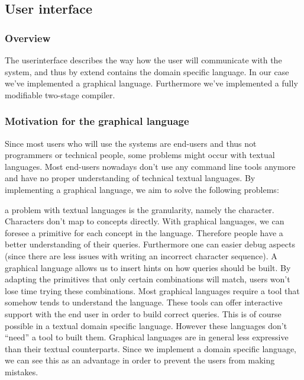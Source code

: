 
\subsection{User interface}
\subsubsection{Overview}
The userinterface describes the way how the user will communicate with the
system, and thus by extend contains the domain specific language. In our case
we've implemented a graphical language. Furthermore we've implemented a fully
modifiable two-stage compiler.
\subsubsection{Motivation for the graphical language}
Since most users who will use the systems are end-users and thus not
programmers or technical people, some problems might occur with textual
languages. Most end-users nowadays don't use any command line tools anymore and
have no proper understanding of technical textual languages. By implementing a
graphical language, we aim to solve the following problems:
\begin{itemize}
  a problem with textual languages is
the granularity, namely the character. Characters don't map to concepts
directly. With graphical languages, we can foresee a primitive for each concept
in the language. Therefore people have a better understanding of their queries.
Furthermore one can easier debug aspects (since there are less issues with
writing an incorrect character sequence).
  A graphical language allows us to insert
hints on how queries should be built. By adapting the primitives that only
certain combinations will match, users won't lose time trying these
combinations.
Most graphical languages require a tool that somehow
tends to understand the language. These tools can offer interactive support
with the end user in order to build correct queries. This is of course possible
in a textual domain specific language. However these languages don't ``need''
a tool to built them.
Graphical languages are in general less
expressive than their textual counterparts. Since we implement a domain
specific language, we can see this as an advantage in order to prevent the
users from making mistakes.
\end{itemize}
